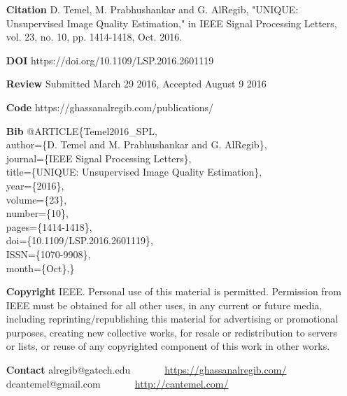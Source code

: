 \documentclass[draftcls,12pt, onecolumn]{IEEEtran}
\date{}
\begin{document}
\begin{itemize}[align=parleft, labelsep=2.0cm]

\item[\textbf{Citation}]{D. Temel, M. Prabhushankar and G. AlRegib, "UNIQUE: Unsupervised Image Quality Estimation," in IEEE Signal Processing Letters, vol. 23, no. 10, pp. 1414-1418, Oct. 2016.
}

\item[\textbf{DOI}]{https://doi.org/10.1109/LSP.2016.2601119}

\item[\textbf{Review}]{Submitted March 29 2016, Accepted August 9 2016}

\item[\textbf{Code}]{https://ghassanalregib.com/publications/}



\item[\textbf{Bib}] {@ARTICLE\{Temel2016\_SPL,\\ 
author=\{D. Temel and M. Prabhushankar and G. AlRegib\},\\ 
journal=\{IEEE Signal Processing Letters\},\\ 
title=\{UNIQUE: Unsupervised Image Quality Estimation\}, \\ 
year=\{2016\},\\ 
volume=\{23\},\\ 
number=\{10\},\\ 
pages=\{1414-1418\},\\ 
doi=\{10.1109/LSP.2016.2601119\},\\ 
ISSN=\{1070-9908\},\\ 
month=\{Oct\},\}
} 

\item[\textbf{Copyright}]{ IEEE. Personal use of this material is permitted. Permission from IEEE must be obtained for all other uses, in any current or future media, including reprinting/republishing this material for advertising or promotional purposes,
creating new collective works, for resale or redistribution to servers or lists, or reuse of any copyrighted component
of this work in other works. }

\item[\textbf{Contact}]{alregib@gatech.edu~~~~~~~\url{https://ghassanalregib.com/}\\dcantemel@gmail.com~~~~~~~\url{http://cantemel.com/}}
\end{itemize}
\thispagestyle{empty}
\newpage
\clearpage
\setcounter{page}{1}
\end{document}
